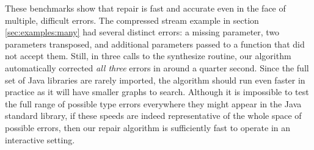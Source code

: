 These benchmarks show that repair is fast and accurate even in the face of multiple, difficult errors. The compressed stream example in section \ref{sec:examples:many} had several distinct errors: a missing parameter, two parameters transposed, and additional parameters passed to a function that did not accept them. Still, in three calls to the synthesize routine, our algorithm automatically corrected \textit{all three} errors in around a quarter second. Since the full set of Java libraries are rarely imported, the algorithm should run even faster in practice as it will have smaller graphs to search. Although it is impossible to test the full range of possible type errors everywhere they might appear in the Java standard library, if these speeds are indeed representative of the whole space of possible errors, then our repair algorithm is sufficiently fast to operate in an interactive setting.
